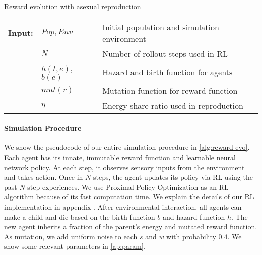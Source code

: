\begin{algorithm}
  \caption{Reward evolution with asexual reproduction}\label{alg:reward-evo}
  \begin{tabular}{lll}
    \textbf{Input:} & $Pop, Env$ & Initial population and simulation environment\\
                    & $N$ & Number of rollout steps used in RL \\
                    & $h(t, e)$, $b(e)$ & Hazard and birth function for agents \\
                    & $mut(r)$ & Mutation function for reward function \\
                    & $\eta$ & Energy share ratio used in reproduction
  \end{tabular}
  \begin{algorithmic}[1]
    \Loop{}
      \EndOnce{}
    \EndFor{}

      \EndWith{}
      \EndWith{}
    \EndFor{}
  \EndLoop{}
\end{algorithmic}
\end{algorithm}

\paragraph{Simulation Procedure}
We show the pseudocode of our entire simulation procedure in \cref{alg:reward-evo}. Each agent has its innate, immutable reward function and learnable neural network policy. At each step, it observes sensory inputs from the environment and takes action. Once in $N$ steps, the agent updates its policy via RL using the past $N$ step experiences. We use Proximal Policy Optimization \citep{schulmanProximalPolicyOptimization2017} as an RL algorithm because of its fast computation time. We explain the details of our RL implementation in appendix . After environmental interaction, all agents can make a child and die based on the birth function $b$ and hazard function $h$. The new agent inherits a fraction of the parent's energy and mutated reward function. As mutation, we add uniform noise to each $s$ and $w$ with probability $0.4$. We show some relevant parameters in \cref{ap:param}.

